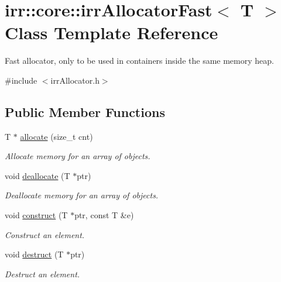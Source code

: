 \hypertarget{classirr_1_1core_1_1irrAllocatorFast}{}\section{irr\+:\+:core\+:\+:irr\+Allocator\+Fast$<$ T $>$ Class Template Reference}
\label{classirr_1_1core_1_1irrAllocatorFast}


Fast allocator, only to be used in containers inside the same memory heap.  




{\ttfamily \#include $<$irr\+Allocator.\+h$>$}

\subsection*{Public Member Functions}
\begin{DoxyCompactItemize}
\item 
\mbox{\label{classirr_1_1core_1_1irrAllocatorFast_a13d11b5583ef053825f7aea8dc3ed283}} 
T $\ast$ \hyperlink{classirr_1_1core_1_1irrAllocatorFast_a13d11b5583ef053825f7aea8dc3ed283}{allocate} (size\+\_\+t cnt)
\begin{DoxyCompactList}\small\item\em Allocate memory for an array of objects. \end{DoxyCompactList}\item 
\mbox{\label{classirr_1_1core_1_1irrAllocatorFast_aa3d0f4fadf4e330abe277ba3f639bb07}} 
void \hyperlink{classirr_1_1core_1_1irrAllocatorFast_aa3d0f4fadf4e330abe277ba3f639bb07}{deallocate} (T $\ast$ptr)
\begin{DoxyCompactList}\small\item\em Deallocate memory for an array of objects. \end{DoxyCompactList}\item 
\mbox{\label{classirr_1_1core_1_1irrAllocatorFast_a0cadba66801009a1118d7046615c8e04}} 
void \hyperlink{classirr_1_1core_1_1irrAllocatorFast_a0cadba66801009a1118d7046615c8e04}{construct} (T $\ast$ptr, const T \&e)
\begin{DoxyCompactList}\small\item\em Construct an element. \end{DoxyCompactList}\item 
\mbox{\label{classirr_1_1core_1_1irrAllocatorFast_a4249f5cde51abf01a25ab53dc173646d}} 
void \hyperlink{classirr_1_1core_1_1irrAllocatorFast_a4249f5cde51abf01a25ab53dc173646d}{destruct} (T $\ast$ptr)
\begin{DoxyCompactList}\small\item\em Destruct an element. \end{DoxyCompactList}\end{DoxyCompactItemize}



